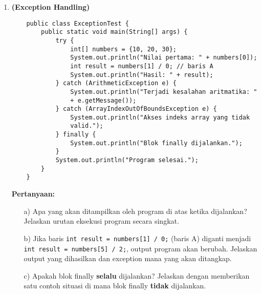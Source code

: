 \documentclass[12pt]{article}
\begin{document}
\begin{enumerate}
    \item \textbf{(Exception Handling)} \\
    \begin{tcolorbox}[title=Program Java - Exception Handling]
    \begin{verbatim}
    public class ExceptionTest {
        public static void main(String[] args) {
            try {
                int[] numbers = {10, 20, 30};
                System.out.println("Nilai pertama: " + numbers[0]);
                int result = numbers[1] / 0; // baris A
                System.out.println("Hasil: " + result);
            } catch (ArithmeticException e) {
                System.out.println("Terjadi kesalahan aritmatika: "
                + e.getMessage());
            } catch (ArrayIndexOutOfBoundsException e) {
                System.out.println("Akses indeks array yang tidak
                valid.");
            } finally {
                System.out.println("Blok finally dijalankan.");
            }
            System.out.println("Program selesai.");
        }
    }
    \end{verbatim}
    \end{tcolorbox}

    \textbf{Pertanyaan:}
    \begin{enumerate}
        \item[a)] Apa yang akan ditampilkan oleh program di atas ketika dijalankan? Jelaskan urutan eksekusi program secara singkat.
        \item[b)] Jika baris \texttt{int result = numbers[1] / 0;} (baris A) diganti menjadi \texttt{int result = numbers[5] / 2;}, output program akan berubah. Jelaskan output yang dihasilkan dan exception mana yang akan ditangkap.
        \item[c)] Apakah blok finally \textbf{selalu} dijalankan? Jelaskan dengan memberikan satu contoh situasi di mana blok finally \textbf{tidak} dijalankan.
    \end{enumerate}

\end{enumerate}
\end{document}
